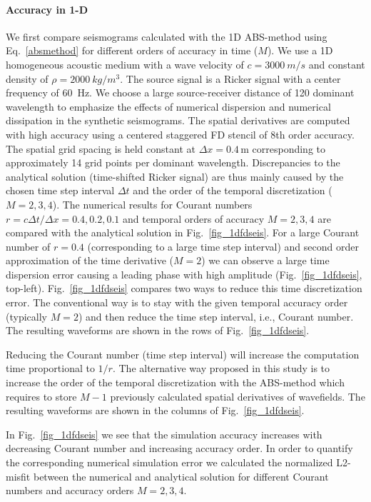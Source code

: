 \paragraph{Accuracy in 1-D}
We first compare seismograms calculated with the 1D ABS-method using Eq.~\ref{absmethod} for different orders of accuracy in time ($M$). We use a 1D homogeneous acoustic  medium with a wave velocity of $c=\SI{3000}{m/s}$ and constant density of $\rho=\SI{2000}{kg/m^3}$. The source signal is a Ricker signal with a center frequency of \SI{60}{Hz}. We choose a large source-receiver distance of 120 dominant wavelength to emphasize the effects of numerical dispersion and numerical dissipation in the synthetic seismograms. The spatial derivatives are computed with high accuracy using a centered staggered FD stencil of 8th order accuracy.  The spatial grid spacing is held constant at $\Delta x=0.4$\,m corresponding to approximately 14 grid points per dominant wavelength. Discrepancies to the analytical solution (time-shifted Ricker signal) are thus mainly caused by the chosen time step interval $\Delta t$ and the order of the temporal discretization ($M=2,3,4$). The numerical results for Courant numbers $r=c \Delta t/\Delta x=0.4, 0.2, 0.1$ and temporal orders of accuracy $M=2, 3, 4$ are compared with the analytical solution in Fig.~\ref{fig_1dfdseis}. For a large Courant number of $r=0.4$ (corresponding to a large time step interval) and second order approximation of the time derivative ($M=2$) we can observe a large time dispersion error causing a leading phase with high amplitude (Fig.~\ref{fig_1dfdseis}, top-left). Fig.~\ref{fig_1dfdseis} compares two ways to reduce this time discretization error. The conventional way is to  stay with the given temporal accuracy order (typically $M=2$) and then reduce the time step interval, i.e., Courant number. The resulting waveforms are shown in the rows of Fig.~\ref{fig_1dfdseis}.

Reducing the Courant number (time step interval) will increase the computation time proportional to $1/r$.  The alternative  way proposed in this study is to increase the order of the temporal discretization with the ABS-method which requires to store $M-1$ previously calculated spatial derivatives of wavefields. The resulting waveforms are shown in the columns of Fig.~\ref{fig_1dfdseis}.

In Fig.~\ref{fig_1dfdseis} we see that the simulation accuracy increases with decreasing Courant number and increasing accuracy order. In order to quantify the corresponding numerical simulation error we calculated the normalized L2-misfit between the numerical and analytical solution for different Courant numbers and accuracy orders $M=2,3,4$. 

